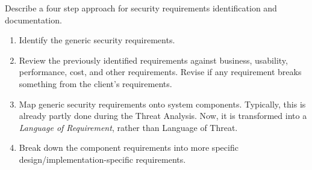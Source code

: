 \begin{questions}
\question{} Describe a four step approach for security requirements identification and documentation.
  \begin{solution}
    \begin{enumerate}[noitemsep]
    \item Identify the generic security requirements.
    \item Review the previously identified requirements against business, usability, performance, cost, and other requirements.
      Revise if any requirement breaks something from the client's requirements.
    \item Map generic security requirements onto system components.
      Typically, this is already partly done during the Threat Analysis.
      Now, it is transformed into a \emph{Language of Requirement}, rather than Language of Threat.
    \item Break down the component requirements into more specific design/implementation-specific requirements.
    \end{enumerate}
  \end{solution}
\end{questions}

